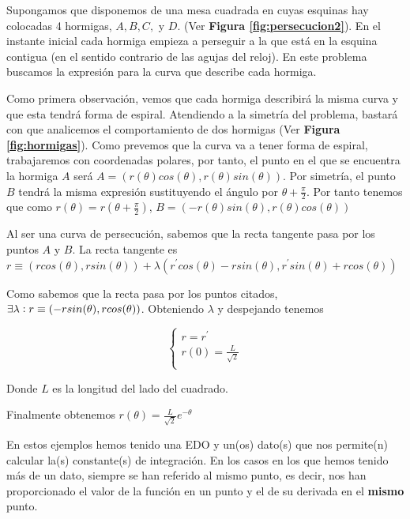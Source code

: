 \documentclass{mathnotes}
\begin{document}
\begin{example}
Supongamos que disponemos de una mesa cuadrada en cuyas esquinas hay colocadas 4 hormigas, $A, B, C,$ y $D$. (Ver \textbf{Figura \ref{fig:persecucion2}}). En el instante inicial cada hormiga empieza a perseguir a la que está en la esquina contigua (en el sentido contrario de las agujas del reloj). En este problema buscamos la expresión para la curva que describe cada hormiga.

Como primera observación, vemos que cada hormiga describirá la misma curva y que esta tendrá forma de espiral. Atendiendo a la simetría del problema, bastará con que analicemos el comportamiento de dos hormigas (Ver \textbf{Figura \ref{fig:hormigas}}). Como prevemos que la curva va a tener forma de espiral, trabajaremos con coordenadas polares, por tanto, el punto en el que se encuentra la hormiga $A$ será $A=(r(\theta)cos(\theta), r(\theta)sin(\theta))$. Por simetría, el punto $B$ tendrá la misma expresión sustituyendo el ángulo por $\theta+\frac{\pi}{2}$. Por tanto tenemos que como $r(\theta)=r(\theta+\frac{\pi}{2})$, $B=(-r(\theta)sin(\theta), r(\theta)cos(\theta))$

Al ser una curva de persecución, sabemos que la recta tangente pasa por los puntos $A$ y $B$. La recta tangente es $r\equiv (rcos(\theta), rsin(\theta))+\lambda(r^\prime cos(\theta)-rsin(\theta),r^\prime sin(\theta)+rcos(\theta))$

Como sabemos que la recta pasa por los puntos citados, $\exists \lambda : r\equiv (-rsin(\theta), rcos(\theta))$. Obteniendo $\lambda$ y despejando tenemos 

\begin{equation*}
  \left\lbrace
  \begin{array}{l}
     r = r^\prime \\
     r(0) = \frac{L}{\sqrt{2}}  \\
  \end{array}
  \right.
\end{equation*}

Donde $L$ es la longitud del lado del cuadrado.

Finalmente obtenemos $r(\theta) = \frac{L}{\sqrt{2}}e^{-\theta}$

\end{example}

En estos ejemplos hemos tenido una EDO y un(os) dato(s) que nos permite(n) calcular la(s) constante(s) de integración. En los casos en los que hemos tenido más de un dato, siempre se han referido al mismo punto, es decir, nos han proporcionado el valor de la función en un punto y el de su derivada en el \textbf{mismo} punto.
\end{document}

